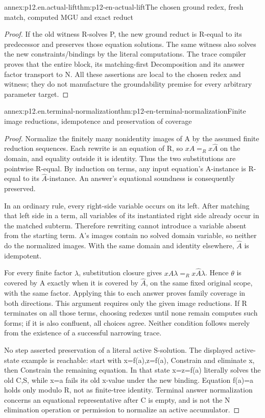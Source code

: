 \begin{annexitem}{annex:p12.en.actual-lift}{thm:p12-en-actual-lift}{The chosen ground redex, fresh match, computed MGU and exact reduct}
\begin{proof}
If the old witness R-solves P, the new ground reduct is R-equal
to its predecessor and preserves those equation solutions. The
same witness also solves the new constraints/bindings by the
literal computations. The trace compiler proves that the entire
block, its matching-first Decomposition and its answer factor
transport to N. All these assertions are local to the chosen
redex and witness; they do not manufacture the groundability
premise for every arbitrary parameter target.
\end{proof}
\end{annexitem}

\begin{annexitem}{annex:p12.en.terminal-normalization}{thm:p12-en-terminal-normalization}{Finite image reductions, idempotence and preservation of coverage}
\begin{proof}
Normalize the finitely many nonidentity images of A by the
assumed finite reduction sequences. Each rewrite is an equation
of R, so \(x A=_R x\widehat A\) on the domain, and equality
outside it is identity. Thus the two substitutions are pointwise
R-equal. By induction on terms, any input equation's A-instance
is R-equal to its \(\widehat A\)-instance. An answer's
equational soundness is consequently preserved.

In an ordinary rule, every right-side variable occurs on its left.
After matching that left side in a term, all variables of its
instantiated right side already occur in the matched subterm.
Therefore rewriting cannot introduce a variable absent from
the starting term. A's images contain no solved domain variable,
so neither do the normalized images. With the same domain and
identity elsewhere, \(\widehat A\) is idempotent.

For every finite factor \(\lambda\), substitution closure gives
\(x A\lambda=_R x\widehat A\lambda\).
Hence \(\theta\) is covered by A exactly when it is covered
by \(\widehat A\), on the same fixed original scope, with
the same factor. Applying this to each answer proves family
coverage in both directions. This argument requires only the
given image reductions. If R terminates on all those terms,
choosing redexes until none remain computes such forms; if it
is also confluent, all choices agree. Neither condition follows
merely from the existence of a successful narrowing trace.

No step asserted preservation of a literal active S-solution.
The displayed active-state example is reachable: start with
x=f(a),z=f(a), Constrain and eliminate x, then Constrain the
remaining equation. In that state x=z=f(a) literally solves
the old C,S, while x=a fails its old x-value under the new
binding. Equation f(a)=a holds only modulo R, not as finite-tree
identity. Terminal answer normalization concerns an equational
representative after C is empty, and is not the N elimination
operation or permission to normalize an active accumulator.
\end{proof}
\end{annexitem}

